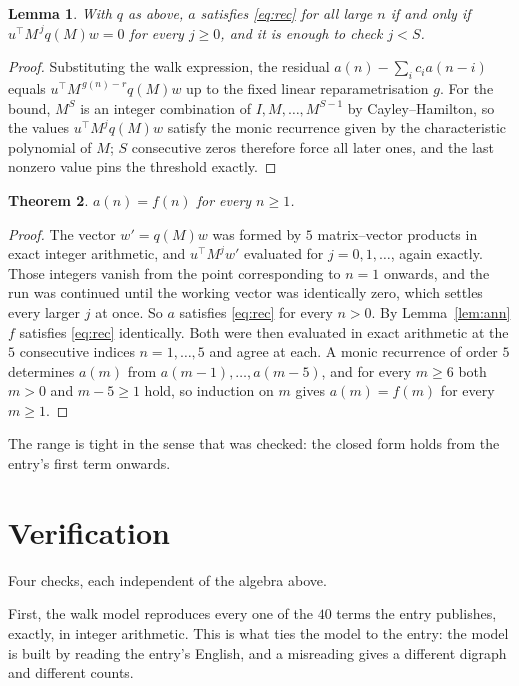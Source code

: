 \documentclass[11pt,a4paper]{article}
\theoremstyle{plain}
\newtheorem{theorem}{Theorem}
\newtheorem{lemma}[theorem]{Lemma}
\theoremstyle{definition}
\begin{document}
\begin{lemma}\label{lem:crit}
With $q$ as above, $a$ satisfies \eqref{eq:rec} for all large $n$ if and only if
$u^{\!\top}M^{\,j}q(M)w=0$ for every $j\ge0$, and it is enough to check $j<S$.
\end{lemma}

\begin{proof}
Substituting the walk expression, the residual $a(n)-\sum_ic_ia(n-i)$ equals
$u^{\!\top}M^{\,g(n)-r}q(M)w$ up to the fixed linear reparametrisation $g$. For the bound,
$M^{S}$ is an integer combination of $I,M,\dots,M^{S-1}$ by Cayley--Hamilton, so the values
$u^{\!\top}M^{j}q(M)w$ satisfy the monic recurrence given by the characteristic polynomial of
$M$; $S$ consecutive zeros therefore force all later ones, and the last nonzero value pins the
threshold exactly.
\end{proof}

\begin{theorem}
$a(n)=f(n)$ for every $n\ge1$.
\end{theorem}

\begin{proof}
The vector $w'=q(M)w$ was formed by $5$ matrix--vector products in exact integer
arithmetic, and $u^{\!\top}M^{j}w'$ evaluated for $j=0,1,\dots$, again exactly. Those integers
vanish from the point corresponding to $n=1$ onwards, and the run was continued until the
working vector was identically zero, which settles every larger $j$ at once. So $a$ satisfies
\eqref{eq:rec} for every $n>0$. By Lemma~\ref{lem:ann} $f$ satisfies \eqref{eq:rec}
identically. Both were then evaluated in exact arithmetic at the $5$ consecutive indices
$n=1,\dots,5$ and agree at each. A monic recurrence of order $5$
determines $a(m)$ from $a(m-1),\dots,a(m-5)$, and for every $m\ge6$ both
$m>0$ and $m-5\ge1$ hold, so induction on $m$ gives $a(m)=f(m)$ for every
$m\ge1$.
\end{proof}

The range is tight in the sense that was checked: the closed form holds from the entry's first term onwards.

\section{Verification}

Four checks, each independent of the algebra above.

First, the walk model reproduces every one of the $40$ terms the entry publishes,
exactly, in integer arithmetic. This is what ties the model to the entry: the model is built
by reading the entry's English, and a misreading gives a different digraph and different
counts.
\end{document}
